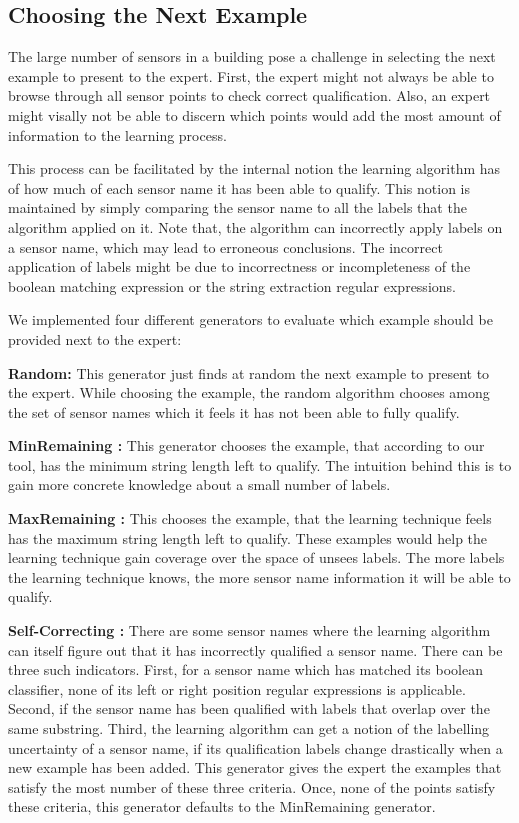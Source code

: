 \subsection{Choosing the Next Example}


The large number of sensors in a building pose a challenge in selecting the next example to present to the expert. First, the expert might not always be able to browse through all sensor points to check correct qualification. Also, an expert might visally not be able to discern which points would add the most amount of information to the learning process. 

This process can be facilitated by the internal notion the learning algorithm has of how much of each sensor name it has been able to qualify. This notion is maintained by simply comparing the sensor name to all the labels that the algorithm applied on it. Note that, the algorithm can incorrectly apply labels on a sensor name, which may lead to erroneous conclusions. The incorrect application of labels might be due to incorrectness or incompleteness of the boolean matching expression or the string extraction regular expressions.

We implemented four different generators to evaluate which example should be provided next to the expert:

{\bf Random:} This generator just finds at random the next example to present to the expert. While choosing the example, the random algorithm chooses among the set of sensor names which it feels it has not been able to fully qualify.  

{\bf MinRemaining :} This generator chooses the example, that according to our tool, has the minimum string length left to qualify. The intuition behind this is to gain more concrete knowledge about a small number of labels.

{\bf MaxRemaining :} This chooses the example, that the learning technique feels has the maximum string length left to qualify. These examples would help the learning technique gain coverage over the space of unsees labels. The more labels the learning technique knows, the more sensor name information it will be able to qualify.

{\bf Self-Correcting :} There are some sensor names where the learning algorithm can itself figure out that it has incorrectly qualified a sensor name. There can be three such indicators. First, for a sensor name which has matched its boolean classifier, none of its left or right position regular expressions is applicable. Second, if the sensor name has been qualified with labels that overlap over the same substring. Third, the learning algorithm can get a notion of the labelling uncertainty of a sensor name, if its qualification labels change drastically when a new example has been added. This generator gives the expert the examples that satisfy the most number of these three criteria. Once, none of the points satisfy these criteria, this generator defaults to the MinRemaining generator.


